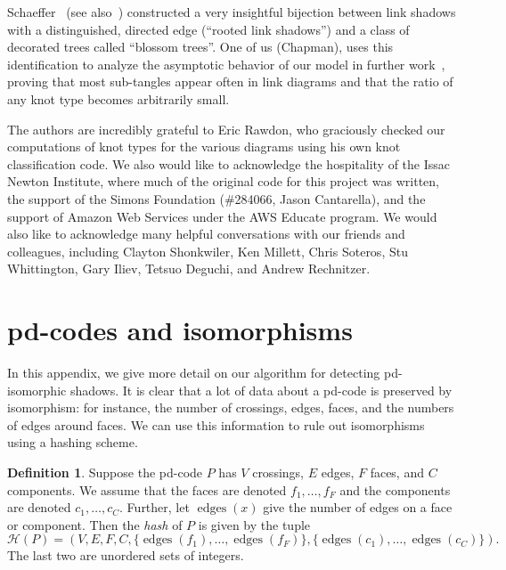 \documentclass[amsmath,secnumarabic,floatfix,amssymb,nofootinbib,nobibnotes,letterpaper,11pt,tightenlines,showkeys]{revtex4}
\theoremstyle{definition}
\newtheorem{definition}[theorem]{Definition}
\newcommand{\pdcode}{pd-code }
\newcommand{\edges}{\operatorname{edges}}
\let\mgp=\marginpar \marginparwidth18mm \marginparsep1mm
\def\marginpar#1{\mgp{\raggedright\tiny #1}}
\let\lbl=\label
\def\label#1{\lbl{#1}\ifinner\else\marginpar{\ref{#1} #1}\ignorespaces\fi}
\begin{document}
Schaeffer~\cite{Schaeffer:1997wo} (see also~\cite{Bouttier:2002iu}) constructed a very insightful bijection between link shadows with a distinguished, directed edge (``rooted link shadows'') and a class of decorated trees called ``blossom trees''. One of us (Chapman), uses this identification to analyze the asymptotic behavior of our model in further work~\cite{Chapman2015knotasymp}, proving that most sub-tangles appear often in link diagrams and that the ratio of any knot type becomes arbitrarily small.

\acknowledgements
The authors are incredibly grateful to Eric Rawdon, who graciously checked our computations of knot types for the various diagrams using his own knot classification code. We also would like to acknowledge the hospitality of the Issac Newton Institute, where much of the original code for this project was written, the support of the Simons Foundation (\#284066, Jason Cantarella), and the support of Amazon Web Services under the AWS Educate program. We would also like to acknowledge many helpful conversations with our friends and colleagues, including Clayton Shonkwiler, Ken Millett, Chris Soteros, Stu Whittington, Gary Iliev, Tetsuo Deguchi, and Andrew Rechnitzer.

\appendix
\section{pd-codes and isomorphisms}
\label{app:pdcodes}

In this appendix, we give more detail on our algorithm for detecting pd-isomorphic shadows. It is clear that a lot of data about a \pdcode is preserved by isomorphism: for instance, the number of crossings, edges, faces, and the numbers of edges around faces. We can use this information to rule out isomorphisms using a hashing scheme.

\begin{definition}
Suppose the \pdcode $P$ has $V$ crossings, $E$ edges, $F$ faces, and $C$ components. We assume that the faces are denoted $f_1, \dots, f_F$ and the components are denoted $c_1, \dots, c_C$. Further, let $\edges(x)$ give the number of edges on a face or component. Then the \emph{hash} of $P$ is given by the tuple
\begin{equation*}
\mathcal{H}(P) = (V,E,F,C,\{ \edges(f_1), \dots, \edges(f_F) \},
 \{ \edges(c_1), \dots, \edges(c_C) \}).
\end{equation*}
The last two are unordered sets of integers.
\end{definition}
\end{document}
